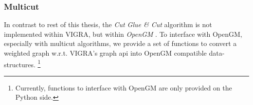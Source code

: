     \subsubsection{Multicut}
        In contrast to rest of this thesis, the \emph{Cut Glue \& Cut} algorithm
        is not implemented within VIGRA, but within \emph{OpenGM} \citep{andres_2012_opengm_arxiv}.
        To interface with OpenGM, especially with multicut algorithms, we provide
        a set of functions to convert a weighted graph w.r.t. VIGRA's graph api
        into OpenGM compatible data-structures.
        \footnote{
            Currently, functions to interface with OpenGM are only provided
            on the Python side.
        }

    





